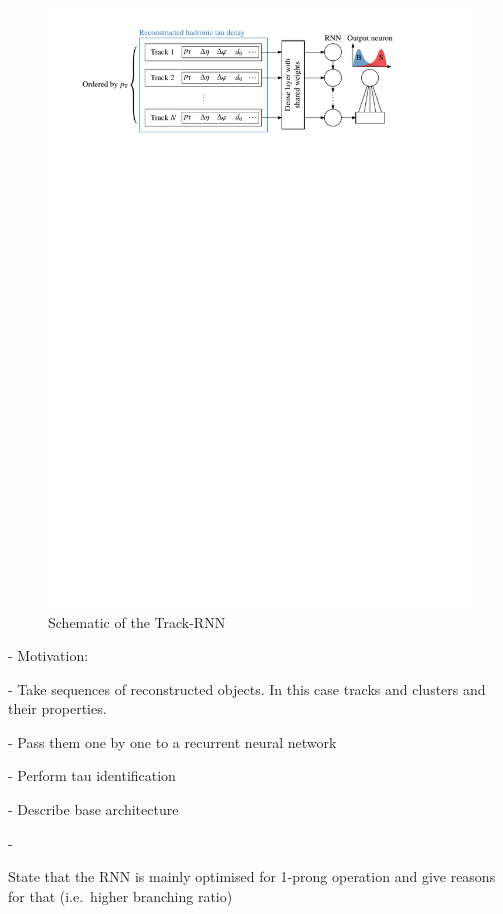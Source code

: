 \begin{figure}[ht]
  \centering
  \includegraphics[scale=0.9]{./figures/rnn/track_rnn_schematic.pdf}
  \caption{Schematic of the Track-RNN}
  \label{fig:track_rnn_schematic}
\end{figure}


- Motivation:

- Take sequences of reconstructed objects. In this case tracks and clusters and
their properties.

- Pass them one by one to a recurrent neural network

- Perform tau identification

- Describe base architecture

-


State that the RNN is mainly optimised for 1-prong operation and give reasons
for that (i.e.\ higher branching ratio)

